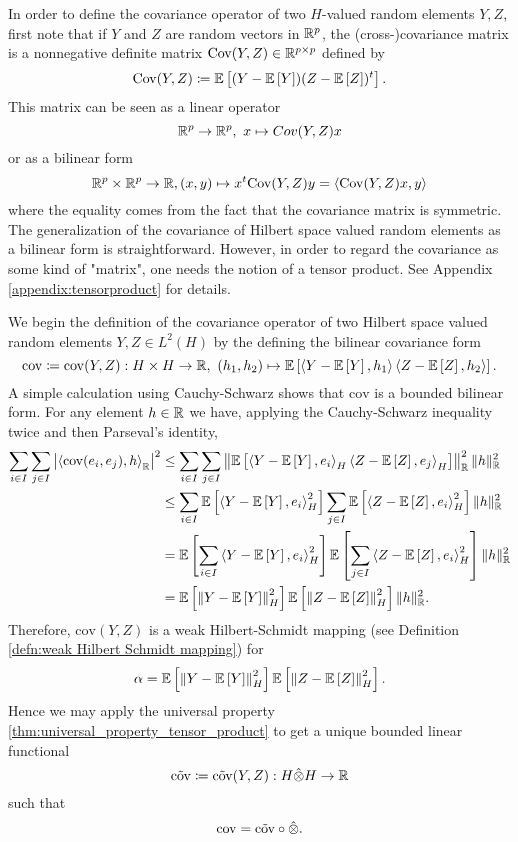 In order to define the covariance operator of two $H$-valued random elements $Y, Z$, first note that if $Y$ and $Z$ are random vectors in $\mathbb{R}^p$, the (cross-)covariance matrix is a nonnegative definite matrix $\mathrm{Cov}(Y, Z) \in \mathbb{R}^{p \times p}$ defined by
\begin{equation} \label{defn:covariance matrix}
    \mathrm{Cov}(Y, Z) \coloneqq \mathbb{E}\left[(Y - \mathbb{E}\left[Y\right])(Z - \mathbb{E}\left[Z\right])^t\right].
\end{equation}
This matrix can be seen as a linear operator 
\[ \mathbb{R}^p \to \mathbb{R}^p, \ x \mapsto Cov(Y, Z) x \]
or as a bilinear form
\[ \mathbb{R}^p \times \mathbb{R}^p \to \mathbb{R}, (x, y) \mapsto x^t \mathrm{Cov}(Y, Z) y = \langle \mathrm{Cov}(Y, Z) x, y \rangle \]
where the equality comes from the fact that the covariance matrix is symmetric. The generalization of the covariance of Hilbert space valued random elements as a bilinear form is straightforward. However, in order to regard the covariance as some kind of "matrix", one needs the notion of a tensor product. %
See Appendix \ref{appendix:tensorproduct} for details.

We begin the definition of the covariance operator of two Hilbert space valued random elements $Y, Z \in L^2(H)$ by the defining the bilinear covariance form 
\[ \mathrm{cov} \coloneqq \mathrm{cov}(Y, Z): H \times H \to \mathbb{R}, \ (h_1, h_2) \mapsto \mathbb{E}\left[\left\langle Y - \mathbb{E}\left[Y\right], h_1  \right\rangle\left\langle Z - \mathbb{E}\left[Z\right], h_2 \right\rangle\right].\]
A simple calculation using Cau\-chy-Schwarz shows that $\mathrm{cov}$ is a bounded bilinear form. For any element $h \in \mathbb{R}$ we have, applying the Cauchy-Schwarz inequality twice and then Parseval's identity,
\begin{align*}
    \sum\limits_{i \in I} \sum\limits_{j \in I} \left| \left\langle \mathrm{cov}(e_i, e_j), h \right\rangle_{\mathbb{R}} \right|^2
    & \leq \sum\limits_{i \in I} \sum\limits_{j \in I} \left\| \mathbb{E}\left[\left\langle Y - \mathbb{E}\left[Y\right], e_i \right\rangle_H \left\langle Z - \mathbb{E}\left[Z\right], e_j \right\rangle_H\right] \right\|_{\mathbb{R}}^2 \|h\|_{\mathbb{R}}^2 \\
    & \leq \sum\limits_{i \in I} \mathbb{E}\left[\left\langle Y - \mathbb{E}\left[Y\right], e_i \right\rangle_H^2\right] \sum\limits_{j \in I} \mathbb{E}\left[\left\langle Z - \mathbb{E}\left[Z\right], e_i \right\rangle_H^2\right] \|h\|_{\mathbb{R}}^2 \\
    & = \mathbb{E}\left[\sum\limits_{i \in I} \left\langle Y - \mathbb{E}\left[Y\right], e_i \right\rangle_H^2\right] \mathbb{E}\left[\sum\limits_{j \in I} \left\langle Z - \mathbb{E}\left[Z\right], e_i \right\rangle_H^2\right] \|h\|_{\mathbb{R}}^2 \\
    & = \mathbb{E}\left[\left\|Y - \mathbb{E}\left[Y\right] \right\|_H^2\right] \mathbb{E}\left[\left\| Z - \mathbb{E}\left[Z\right] \right\|_H^2\right] \|h\|_{\mathbb{R}}^2.
\end{align*}
Therefore, $\mathrm{cov}(Y, Z)$ is a weak Hilbert-Schmidt mapping (see Definition \ref{defn:weak Hilbert Schmidt mapping}) for 
\[ \alpha = \mathbb{E}\left[\left\|Y - \mathbb{E}\left[Y\right] \right\|_H^2\right] \mathbb{E}\left[\left\| Z - \mathbb{E}\left[Z\right] \right\|_H^2\right]. \]
Hence we may apply the universal property \ref{thm:universal_property_tensor_product} to get a unique bounded linear functional
\[ \Tilde{\mathrm{cov}} \coloneqq \Tilde{\mathrm{cov}}(Y, Z): H \hat{\otimes} H \to \mathbb{R} \]
such that
\[ \mathrm{cov} = \Tilde{\mathrm{cov}} \circ \hat{\otimes}. \]

